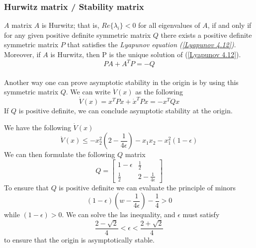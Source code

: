 \documentclass{article}
\begin{document}
\subsubsection{Hurwitz matrix / Stability matrix}
$A$ matrix $A$ is Hurwitz; that is, $Re\{\lambda_i\} < 0$ for all eigenvalues of $A$, if
and only if for any given positive definite symmetric matrix $Q$ there exists a positive
definite symmetric matrix $P$ that satisfies the \textit{Lyapunov equation (\ref{Lyapunov 4.12})}. Moreover,
if $A$ is Hurwitz, then P is the unique solution of (\ref{Lyapunov 4.12}).
\begin{equation}
	PA+A^TP=-Q
	\label{Lyapunov 4.12}
\end{equation}
\\
Another way one can prove asymptotic stability in the origin is by using this symmetric matrix $Q$. We can write $\dot V(x)$ as the following
\begin{equation*}
	\dot V(x) = x^T P \dot x + \dot x^T P x = -x^T Q x
\end{equation*}
If $Q$ is positive definite, we can conclude asymptotic stability at the origin.
\\
\begin{frm-ex}
\item
We have the following $\dot V(x)$
\begin{equation*}
	\dot V(x) \leq -x_2^2\left(2 - \frac{1}{4\epsilon}\right) - x_1x_2 - x_1^2(1-\epsilon)
\end{equation*}
We can then formulate the following $Q$ matrix
\begin{equation*}
	Q =
	\begin{bmatrix}
		1 - \epsilon & \frac{1}{2}              \\
		\frac{1}{2}  & 2 - \frac{1}{4 \epsilon}
	\end{bmatrix}
\end{equation*}
To ensure that $Q$ is positive definite we can evaluate the principle of minors
\begin{equation*}
	(1 - \epsilon) \left( w - \frac{1}{4 \epsilon} \right) - \frac{1}{4} > 0
\end{equation*}
while $(1 - \epsilon) > 0$. We can solve the las inequality, and $\epsilon$ must satisfy
\begin{equation*}
	\frac{2 - \sqrt{2}}{4} < \epsilon < \frac{2 + \sqrt{2}}{4}
\end{equation*}
to ensure that the origin is asymptotically stable.
\end{frm-ex}
\end{document}
